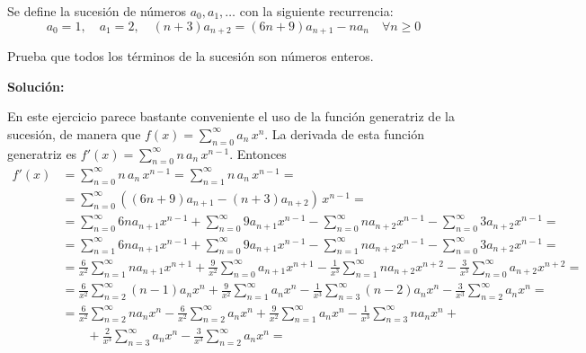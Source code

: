 \documentclass[../../main.tex]{subfiles}
\begin{document}
  \begin{shaded}
    Se define la sucesión de números $a_0, a_1, \dots$ con la siguiente recurrencia:
    $$
    a_0 = 1, \quad a_1 = 2, \quad (n + 3) a_{n+2} = (6n + 9) a_{n+1} - n a_n \quad \forall n \geq 0
    $$

    Prueba que todos los términos de la sucesión son números enteros.
  \end{shaded}

  \textbf{Solución:}

  En este ejercicio parece bastante conveniente el uso de la función generatriz de la sucesión, de manera que $f(x) = \displaystyle\sum_{n = 0}^\infty a_n \, x^n$. La derivada de esta función generatriz es $f'(x) = \displaystyle\sum_{n = 0}^\infty n \, a_n \, x^{n - 1}$. Entonces
  \begin{equation*}
    \begin{split}
      f'(x) & =
      \sum_{n = 0}^\infty n \, a_n \, x^{n - 1} = \sum_{n = 1}^\infty n \, a_n \, x^{n - 1} = \\ & =
      \sum_{n = 0}^\infty \left((6n + 9) a_{n + 1} - (n + 3) a_{n + 2}\right) \, x^{n - 1} = \\ & =
      \sum_{n = 0}^\infty 6n a_{n + 1} x^{n - 1} + \sum_{n = 0}^\infty 9 a_{n + 1} x^{n - 1} - \sum_{n = 0}^\infty n a_{n + 2} x^{n - 1} - \sum_{n = 0}^\infty 3 a_{n + 2} x^{n - 1} = \\ & =
      \sum_{n = 1}^\infty 6n a_{n + 1} x^{n - 1} + \sum_{n = 0}^\infty 9 a_{n + 1} x^{n - 1} - \sum_{n = 1}^\infty n a_{n + 2} x^{n - 1} - \sum_{n = 0}^\infty 3 a_{n + 2} x^{n - 1} = \\ & =
      \frac{6}{x^2}\sum_{n = 1}^\infty n a_{n + 1} x^{n + 1} + \frac{9}{x^2} \sum_{n = 0}^\infty a_{n + 1} x^{n + 1} - \frac{1}{x^3} \sum_{n = 1}^\infty n a_{n + 2} x^{n + 2} - \frac{3}{x^3} \sum_{n = 0}^\infty a_{n + 2} x^{n + 2} = \\ & =
      \frac{6}{x^2}\sum_{n = 2}^\infty (n - 1) a_n x^n + \frac{9}{x^2} \sum_{n = 1}^\infty a_n x^n - \frac{1}{x^3} \sum_{n = 3}^\infty (n - 2) a_n x^n - \frac{3}{x^3} \sum_{n = 2}^\infty a_n x^n = \\ & =
      \frac{6}{x^2}\sum_{n = 2}^\infty n a_n x^n - \frac{6}{x^2}\sum_{n = 2}^\infty a_n x^n + \frac{9}{x^2} \sum_{n = 1}^\infty a_n x^n - \frac{1}{x^3} \sum_{n = 3}^\infty n a_n x^n + \\ & \qquad + \frac{2}{x^3} \sum_{n = 3}^\infty  a_n x^n - \frac{3}{x^3} \sum_{n = 2}^\infty a_n x^n =
    \end{split}
  \end{equation*}
\end{document}
